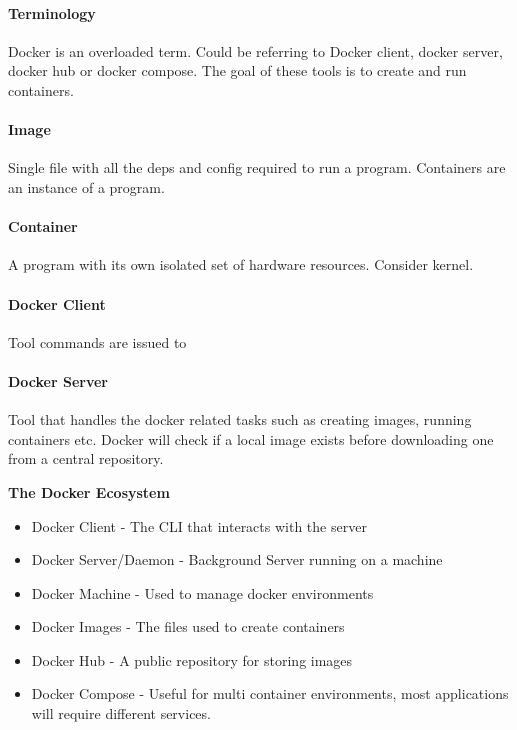 \documentclass[a4paper, 11pt]{book}
\begin{document}
    \paragraph{Terminology}
    Docker is an overloaded term.
    Could be referring to Docker client, docker server, docker hub or docker compose.
    The goal of these tools is to create and run containers.

    \paragraph{Image}
    Single file with all the deps and config required to run a program.
    Containers are an instance of a program.

    \paragraph{Container}
    A program with its own isolated set of hardware resources. Consider kernel.

    \paragraph{Docker Client}
    Tool commands are issued to

    \paragraph{Docker Server}
    Tool that handles the docker related tasks such as creating images, running containers etc.
    Docker will check if a local image exists before downloading one from a central repository.


    \textbf{The Docker Ecosystem}

    \begin{itemize}[label=-]
        \item Docker Client - The CLI that interacts with the server
        \item Docker Server/Daemon - Background Server running on a machine
        \item Docker Machine - Used to manage docker environments
        \item Docker Images - The files used to create containers
        \item Docker Hub - A public repository for storing images
        \item Docker Compose - Useful for multi container environments, most applications will require different services.
    \end{itemize}
\end{document}
